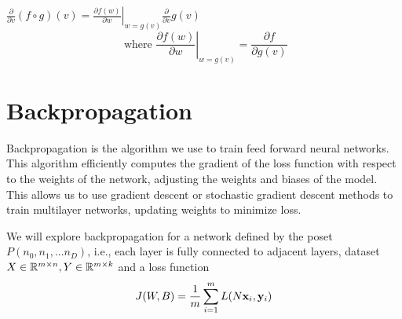 \begin{remark}
    $\displaystyle\frac{\partial}{\partial v}(f \circ g)(v)=\left.\frac{\partial f(w)}{\partial w}\right|_{w=g(v)} \frac{\partial}{\partial v} g(v) $
$$
\text { where }\left.\frac{\partial f(w)}{\partial w}\right|_{w=g(v)}=\frac{\partial f}{\partial g(v)}
$$
\end{remark}

\section{Backpropagation}

Backpropagation is the algorithm we use to train feed forward neural networks. This algorithm efficiently computes the gradient of the loss function with respect to the weights of the network, adjusting the weights and biases of the model. This allows us to use gradient descent or stochastic gradient descent methods to train multilayer networks, updating weights to minimize loss.


We will explore backpropagation for a network defined by the poset $P(n_{0},n_{1},...n_{D})$, i.e., each layer is fully connected to adjacent layers, dataset $X\in\R^{m\times n}, Y\in\R^{m\times k}$ and a loss function
$$J(W,B)=\frac{1}{m}\sum_{i=1}^{m}L(N\vx_{i},\vy_{i})$$


